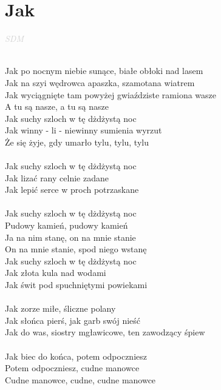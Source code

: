\documentclass[a5paper, 10pt]{book}
\begin{document}
\newpage
\section{Jak}\textcolor{lightgray}{\textit{SDM}}\\~\\
\begin{minipage}[t]{0.75\textwidth}
Jak po nocnym niebie sunące, białe obłoki nad lasem\\
Jak na szyi wędrowca apaszka, szamotana wiatrem\\
Jak wyciągnięte tam powyżej gwiaździste ramiona wasze\\
A tu są nasze, a tu są nasze\\

Jak suchy szloch w tę dżdżystą noc\\
Jak winny - li - niewinny sumienia wyrzut\\
Że się żyje, gdy umarło tylu, tylu, tylu\\
\\
Jak suchy szloch w tę dżdżystą noc\\
Jak lizać rany celnie zadane\\
Jak lepić serce w proch potrzaskane\\
\\
Jak suchy szloch w tę dżdżystą noc\\
Pudowy kamień, pudowy kamień\\
Ja na nim stanę, on na mnie stanie\\
On na mnie stanie, spod niego wstanę\\
Jak suchy szloch w tę dżdżystą noc\\
Jak złota kula nad wodami\\
Jak świt pod spuchniętymi powiekami\\
\\
Jak zorze miłe, śliczne polany\\
Jak słońca pierś, jak garb swój nieść\\
Jak do was, siostry mgławicowe, ten zawodzący śpiew\\
\\
Jak biec do końca, potem odpoczniesz\\
Potem odpoczniesz, cudne manowce\\
Cudne manowce, cudne, cudne manowce\\
\end{minipage}
\end{document}
